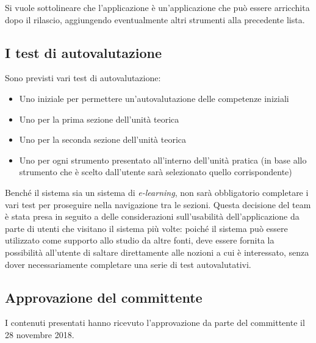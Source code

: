Si vuole sottolineare che l'applicazione \ProjectTitle{} è un'applicazione che può essere arricchita dopo il rilascio, aggiungendo eventualmente altri strumenti alla precedente lista.

\subsection{I test di autovalutazione}
Sono previsti vari test di autovalutazione:
\begin{itemize}
	\item Uno iniziale per permettere un'autovalutazione delle competenze iniziali
	\item Uno per la prima sezione dell'unità teorica
	\item Uno per la seconda sezione dell'unità teorica
	\item Uno per ogni strumento presentato all'interno dell'unità pratica (in base allo strumento che è scelto dall'utente sarà selezionato quello corrispondente)
\end{itemize}
Benché il sistema sia un sistema di \emph{e-learning}, non sarà obbligatorio completare i vari test per proseguire nella navigazione tra le sezioni. Questa decisione del team è stata presa in seguito a delle considerazioni sull'usabilità dell'applicazione da parte di utenti che visitano il sistema più volte: poiché il sistema può essere utilizzato come supporto allo studio da altre fonti, deve essere fornita la possibilità all'utente di saltare direttamente alle nozioni a cui è interessato, senza dover necessariamente completare una serie di test autovalutativi.

\subsection*{Approvazione del committente}
I contenuti presentati hanno ricevuto l'approvazione da parte del committente il 28 novembre 2018.